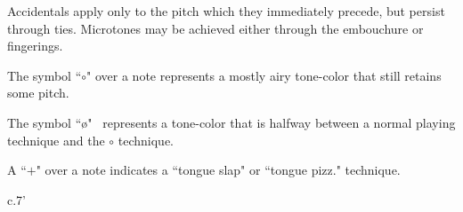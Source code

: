 \documentclass[10pt]{article}
\begin{document}
\begin{center}
Accidentals apply only to the pitch which they immediately precede, but persist through ties. Microtones may be achieved either through the embouchure or fingerings.
\end{center}

\begin{center}
The symbol ``$\circ$" over a note represents a mostly airy tone-color that still retains some pitch.
\end{center}

\begin{center}
The symbol ``\o" \ represents a tone-color that is halfway between a normal playing technique and the $\circ$ technique.
\end{center}

\begin{center}
A ``$+$" over a note indicates a ``tongue slap" or ``tongue pizz." technique.
\end{center}

\vspace*{0.3\baselineskip}

\begin{center}
c.7'
\end{center}
\end{document}

